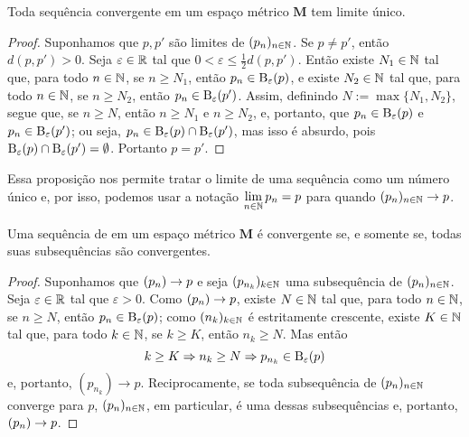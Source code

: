 \begin{corollary}
Toda sequência convergente em um espaço métrico $\bm M$ tem limite único.
\end{corollary}
\begin{proof}
Suponhamos que $p,p'$ são limites de $(p_n)_{n \in \mathbb{N}}$. Se $p \neq p'$, então $d(p,p')>0$. Seja $\varepsilon \in \mathbb{R}$ tal que $0 < \varepsilon \leq \frac{1}{2} d(p,p')$. Então existe $N_1 \in \mathbb{N}$ tal que, para todo $n \in \mathbb{N}$, se $n \geq N_1$, então $p_n \in \mathrm{B}_\varepsilon(p)$, e existe $N_2 \in \mathbb{N}$ tal que, para todo $n \in \mathbb{N}$, se $n \geq N_2$, então $p_n \in \mathrm{B}_\varepsilon(p')$. Assim, definindo $N := \max \{N_1,N_2\}$, segue que, se $n \geq N$, então $n \geq N_1$ e $n \geq N_2$, e, portanto, que $p_n \in \mathrm{B}_\varepsilon(p)$ e $p_n \in \mathrm{B}_\varepsilon(p')$; ou seja, $p_n \in \mathrm{B}_\varepsilon(p) \cap \mathrm{B}_\varepsilon(p')$, mas isso é absurdo, pois $\mathrm{B}_\varepsilon(p) \cap \mathrm{B}_\varepsilon(p')=\emptyset$. Portanto $p=p'$.
\end{proof}

Essa proposição nos permite tratar o limite de uma sequência como um número único e, por isso, podemos usar a notação $\displaystyle\lim_{n \in \mathbb{N}} p_n = p$ para quando $(p_n)_{n \in \mathbb{N}} \rightarrow p$.

\begin{proposition}
Uma sequência de em um espaço métrico $\bm M$ é convergente se, e somente se, todas suas subsequências são convergentes.
\end{proposition}
\begin{proof}
	Suponhamos que $(p_n) \rightarrow p$ e seja $(p_{n_k})_{k \in \mathbb{N}}$ uma subsequência de $(p_n)_{n \in \mathbb{N}}$. Seja $\varepsilon \in \mathbb{R}$ tal que $\varepsilon > 0$. Como $(p_n) \rightarrow p$, existe $N \in \mathbb{N}$ tal que, para todo $n \in \mathbb{N}$, se $n \geq N$, então $p_n \in \mathrm{B}_\varepsilon(p)$; como $(n_k)_{k \in \mathbb{N}}$ é estritamente crescente, existe $K \in \mathbb{N}$ tal que, para todo $k \in \mathbb{N}$, se $k \geq K$, então $n_k \geq N$. Mas então
	\begin{equation*}
	k \geq K \Rightarrow n_k \geq N \Rightarrow p_{n_k} \in \mathrm{B}_\varepsilon(p)
	\end{equation*}
e, portanto, $(p_{n_k}) \to p$.	Reciprocamente, se toda subsequência de $(p_n)_{n \in \mathbb{N}}$ converge para $p$, $(p_n)_{n \in \mathbb{N}}$, em particular, é uma dessas subsequências e, portanto, $(p_n) \rightarrow p$.
\end{proof}

